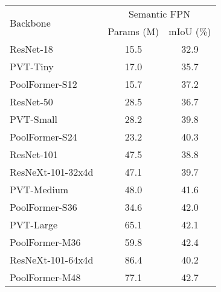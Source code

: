 \begin{tabular}{l|c|c}
\toprule
\multirow{2}{*}{Backbone} & \multicolumn{2}{c}{Semantic FPN}\\
\cline{2-3}
& Params (M) & mIoU (\%) \\
    \whline
	\resnetdot{} ResNet-18~\cite{resnet}                & 15.5 &  32.9 \\
	\pvtdot{} PVT-Tiny~\cite{pvt}           & 17.0 &  35.7 \\
	\poolformer{} PoolFormer-S12                    & 15.7 &  37.2 \\
	\hline
    \resnetdot{} ResNet-50~\cite{resnet}                & 28.5 &  36.7 \\
    \pvtdot{} PVT-Small~\cite{pvt}          & 28.2 &  39.8 \\
	\poolformer{} PoolFormer-S24                    & 23.2 &  40.3 \\
    \hline
    \resnetdot{} ResNet-101~\cite{resnet}               & 47.5 &  38.8\\
    \resnetdot{} ResNeXt-101-32x4d~\cite{xie2017aggregated} & 47.1 &  39.7 \\
    \pvtdot{} PVT-Medium~\cite{pvt}         & 48.0 & 41.6 \\
    \poolformer{} PoolFormer-S36                    & 34.6 & 42.0 \\
    \hline
    \pvtdot{} PVT-Large~\cite{pvt}          & 65.1 &  42.1 \\
    \poolformer{} PoolFormer-M36                    & 59.8 & 42.4 \\
    \hline
    \resnetdot{} ResNeXt-101-64x4d~\cite{xie2017aggregated} & 86.4 &  40.2 \\
    \poolformer{} PoolFormer-M48                   & 77.1 &  42.7 \\
\bottomrule
\end{tabular}